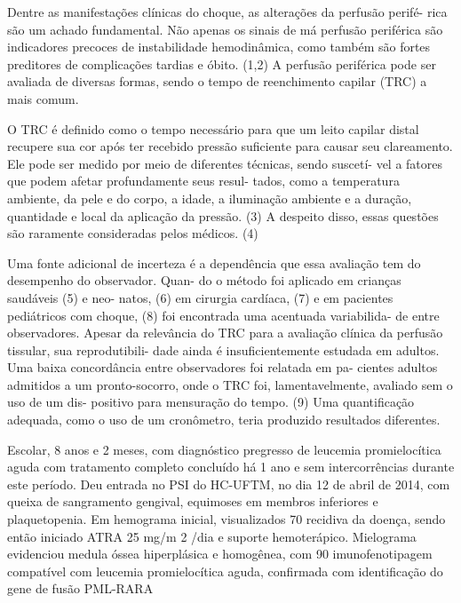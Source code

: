 \begin{multicols}{2}

\par{}Dentre as manifestações clínicas do choque, as alterações da perfusão perifé-
rica são um achado fundamental. Não apenas os sinais de má perfusão periférica
são indicadores precoces de instabilidade hemodinâmica, como também são
fortes preditores de complicações tardias e óbito. (1,2) A perfusão periférica pode
ser avaliada de diversas formas, sendo o tempo de reenchimento capilar (TRC)
a mais comum.\par{}O TRC é definido como o tempo necessário para que
um leito capilar distal recupere sua cor após ter recebido
pressão suficiente para causar seu clareamento. Ele pode
ser medido por meio de diferentes técnicas, sendo suscetí-
vel a fatores que podem afetar profundamente seus resul-
tados, como a temperatura ambiente, da pele e do corpo,
a idade, a iluminação ambiente e a duração, quantidade
e local da aplicação da pressão. (3) A despeito disso, essas
questões são raramente consideradas pelos médicos. (4)\par{}Uma fonte adicional de incerteza é a dependência que
essa avaliação tem do desempenho do observador. Quan-
do o método foi aplicado em crianças saudáveis (5) e neo-
natos, (6) em cirurgia cardíaca, (7) e em pacientes pediátricos
com choque, (8) foi encontrada uma acentuada variabilida-
de entre observadores. Apesar da relevância do TRC para
a avaliação clínica da perfusão tissular, sua reprodutibili-
dade ainda é insuficientemente estudada em adultos. Uma
baixa concordância entre observadores foi relatada em pa-
cientes adultos admitidos a um pronto-socorro, onde o
TRC foi, lamentavelmente, avaliado sem o uso de um dis-
positivo para mensuração do tempo. (9) Uma quantificação
adequada, como o uso de um cronômetro, teria produzido
resultados diferentes.


\par{}Escolar, 8 anos e 2 meses, com diagnóstico pregresso
de leucemia promielocítica aguda com tratamento completo
concluído há 1 ano e sem intercorrências durante este período.
Deu entrada no PSI do HC-UFTM, no dia 12 de abril de
2014, com queixa de sangramento gengival, equimoses em
membros inferiores e plaquetopenia. Em hemograma inicial,
visualizados 70%
recidiva da doença, sendo então iniciado ATRA 25 mg/m 2 /dia
e suporte hemoterápico. Mielograma evidenciou medula
óssea hiperplásica e homogênea, com 90%
imunofenotipagem compatível com leucemia promielocítica
aguda, confirmada com identificação do gene de fusão
PML-RARA


\end{multicols}
